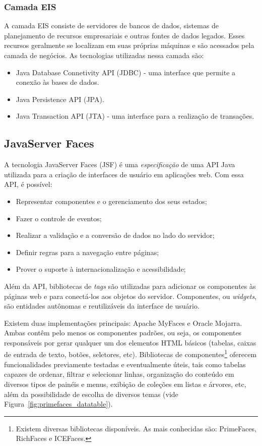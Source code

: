 \documentclass[
  10.5pt,				  %
	openright,			%
	twoside,			  %
  a5paper,
  chapter=TITLE,	%
	section=TITLE,	%
  hyphens,        %
	english,        %
	brazil          %
]{abntex2}
\begin{document}
\subsubsection{Camada EIS}

A camada EIS consiste de servidores de bancos de dados, sistemas de planejamento de recursos empresariais e outras fontes de dados legados. Esses recursos geralmente se localizam em suas próprias máquinas e são acessados pela camada de negócios. As tecnologias utilizadas nessa camada são:
\begin{itemize}
  \item Java Database Connetivity API (JDBC) - uma interface que permite a conexão às bases de dados.
  \item Java Persistence API (JPA).
  \item Java Transaction API (JTA) - uma interface para a realização de transações.
\end{itemize}

\subsection{JavaServer Faces}\label{sec:jsf}

A tecnologia JavaServer Faces (JSF) é uma \emph{especificação} de uma API Java utilizada para a criação de interfaces de usuário em aplicações web. Com essa API, é possível:
%
\begin{itemize}
  \item Representar componentes e o gerenciamento dos seus estados;
  \item Fazer o controle de eventos;
  \item Realizar a validação e a conversão de dados no lado do servidor;
  \item Definir regras para a navegação entre páginas;
  \item Prover o suporte à internacionalização e acessibilidade;
\end{itemize}
%
Além da API, bibliotecas de \emph{tags} são utilizadas para adicionar os componentes às páginas web e para conectá-los aos objetos do servidor. Componentes, ou \emph{widgets}, são entidades autônomas e reutilizáveis da interface de usuário.

Existem duas implementações principais: Apache MyFaces e Oracle Mojarra. Ambas contêm pelo menos os componentes padrões, ou seja, os componentes responsáveis por gerar qualquer um dos elementos HTML básicos (tabelas, caixas de entrada de texto, botões, seletores, etc). Bibliotecas de componentes\footnote{Existem diversas bibliotecas disponíveis. As mais conhecidas são: PrimeFaces, RichFaces e ICEFaces.} oferecem funcionalidades previamente  testadas e eventualmente úteis, tais como tabelas capazes de ordenar, filtrar e selecionar linhas, organização do conteúdo em diversos tipos de painéis e menus, exibição de coleções em listas e árvores, etc, além da possibilidade de escolha de diversos temas (vide Figura~\ref{fig:primefaces_datatable}).
\end{document}
